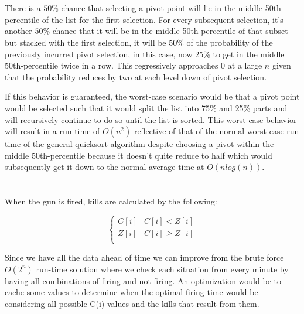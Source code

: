 \documentclass[12pt]{article}
\begin{document}
\maketitle

\section{}
There is a $50\%$ chance that selecting a pivot point will lie in the middle 50th-percentile of the list for the first selection. For every subsequent selection, it's another $50\%$ chance that it will be in the middle 50th-percentile of that subset but stacked with the first selection, it will be $50\%$ of the probability of the previously incurred pivot selection, in this case, now 25\% to get in the middle 50th-percentile twice in a row. This regressively approaches 0 at a large $n$ given that the probability reduces by two at each level down of pivot selection.\newline

\noindent If this behavior is guaranteed, the worst-case scenario would be that a pivot point would be selected such that it would split the list into 75\% and 25\% parts and will recursively continue to do so until the list is sorted. This worst-case behavior will result in a run-time of $O(n^2)$ reflective of that of the normal worst-case run time of the general quicksort algorithm despite choosing a pivot within the middle 50th-percentile because it doesn't quite reduce to half which would subsequently get it down to the normal average time at $O(nlog(n))$.

\section{}
When the gun is fired, kills are calculated by the following:

\[   \left\{
\begin{array}{ll}
	  C[i] & C[i] < Z[i] \\
      Z[i] & C[i]\geq Z[i] \\
\end{array} 
\right. \]

\noindent Since we have all the data ahead of time we can improve from the brute force $O(2^n)$ run-time solution where we check each situation from every minute by having all combinations of firing and not firing. An optimization would be to cache some values to determine when the optimal firing time would be considering all possible C(i) values and the kills that result from them. 
\end{document}
